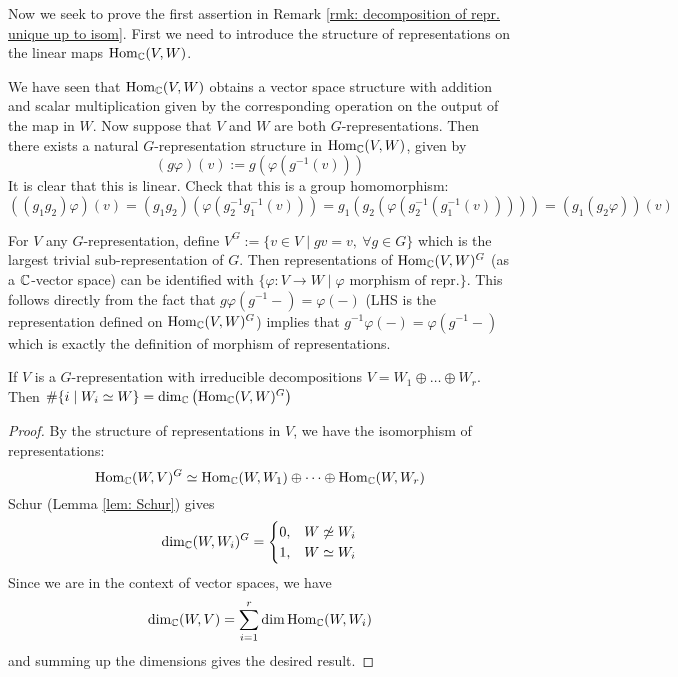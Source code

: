 \textstart
Now we seek to prove the first assertion in Remark \ref{rmk: decomposition of repr. unique up to isom}. First we need to introduce the structure of representations on the linear maps $\mathrm{Hom}_{\mathbb{C}}(V, W)$.

We have seen that $\mathrm{Hom}_{\mathbb{C}}(V, W)$ obtains a vector space structure with addition and scalar multiplication given by the corresponding operation on the output of the map in $W$. Now suppose that $V$ and $W$ are both $G$-representations. Then there exists a natural $G$-representation structure in $\mathrm{Hom}_{\mathbb{C}}(V, W)$, given by 
\[
    (g \varphi)(v) := g\left( \varphi(g^{-1}(v)) \right)
\]
It is clear that this is linear. Check that this is a group homomorphism:
\[
    ((g_1 g_2) \varphi)(v) = (g_1 g_2) (\varphi ( g_2^{-1} g_1^{-1}(v) )) = g_1\left( g_2 (\varphi(g_2^{-1}(g_1^{-1}(v)))) \right) = (g_1 (g_2 \varphi))(v)
\]

\begin{remark}
    For $V$ any $G$-representation, define $V^G := \{ v \in V \mid gv = v,\ \forall g \in G \}$ which is the largest trivial sub-representation of $G$. Then representations of $\mathrm{Hom}_{\mathbb{C}}(V, W)^G$ (as a $\mathbb{C}$-vector space) can be identified with $\{ \varphi: V \to W \mid \varphi \text{ morphism of repr.} \}$. This follows directly from the fact that $g\varphi(g^{-1} -) = \varphi(-)$ (LHS is the representation defined on $\mathrm{Hom}_{\mathbb{C}}(V, W)^G$) implies that $g^{-1}\varphi(-) = \varphi(g^{-1}-)$ which is exactly the definition of morphism of representations.
\end{remark}

\begin{corollary}
    If $V$ is a $G$-representation with irreducible decompositions $V = W_1 \oplus \dots \oplus W_r$. Then $\#\{ i \mid W_i \simeq W \} = \dim_{\mathbb{C}}\left( \mathrm{Hom}_{\mathbb{C}}(V, W)^G \right)$
\end{corollary}

\begin{proof}
    By the structure of representations in $V$, we have the isomorphism of representations:
    \[
        \mathrm{Hom}_{\mathbb{C}}(W, V)^G \simeq \mathrm{Hom}_{\mathbb{C}}(W, W_1) \oplus \dots \oplus \mathrm{Hom}_{\mathbb{C}}(W, W_r)
    \]
    Schur (Lemma \ref{lem: Schur}) gives 
    \[
        \dim_{\C}(W, W_i)^G = 
        \begin{cases}
            0, & W \nsimeq W_i \\
            1, & W \simeq W_i
        \end{cases}
    \]
    Since we are in the context of vector spaces, we have
    \[
        \dim_{\mathbb{C}}(W, V) = \sum_{i = 1}^r \dim \mathrm{Hom}_{\mathbb{C}} (W, W_i)
    \]
    and summing up the dimensions gives the desired result.
\end{proof}


